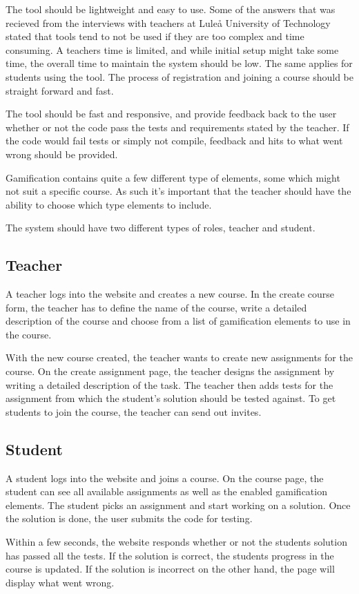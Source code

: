 The tool should be lightweight and easy to use. Some of the answers that was recieved from the interviews with teachers at Luleå University of Technology stated that tools tend to not be used if they are too complex and time consuming. A teachers time is limited, and while initial setup might take some time, the overall time to maintain the system should be low. The same applies for students using the tool. The process of registration and joining a course should be straight forward and fast.

The tool should be fast and responsive, and provide feedback back to the user whether or not the code pass the tests and requirements stated by the teacher. If the code would fail tests or simply not compile, feedback and hits to what went wrong should be provided. 

Gamification contains quite a few different type of elements, some which might not suit a specific course. As such it's important that the teacher should have the ability to choose which type elements to include.

The system should have two different types of roles, teacher and student.

\subsection{Teacher}
A teacher logs into the website and creates a new course. In the create course form, the teacher has to define the name of the course, write a detailed description of the course and choose from a list of gamification elements to use in the course. 

With the new course created, the teacher wants to create new assignments for the course. On the create assignment page, the teacher designs the assignment by writing a detailed description of the task. The teacher then adds tests for the assignment from which the student's solution should be tested against. To get students to join the course, the teacher can send out invites.

\subsection{Student}
A student logs into the website and joins a course. On the course page, the student can see all available assignments as well as the enabled gamification elements. The student picks an assignment and start working on a solution. Once the solution is done, the user submits the code for testing.

Within a few seconds, the website responds whether or not the students solution has passed all the tests. If the solution is correct, the students progress in the course is updated. If the solution is incorrect on the other hand, the page will display what went wrong.
